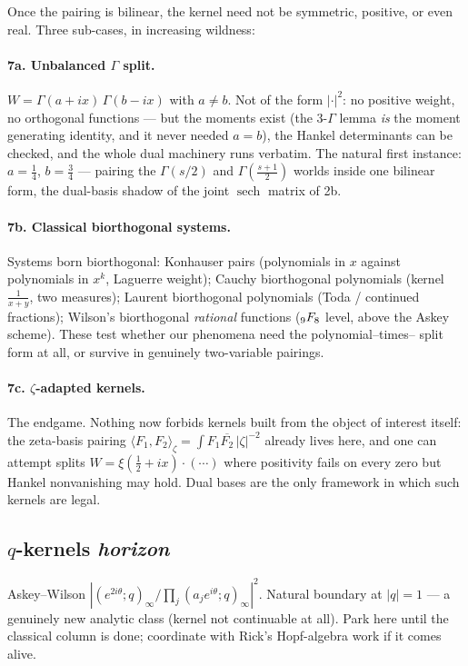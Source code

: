 \documentclass[11pt,a4paper]{article}
\begin{document}
Once the pairing is bilinear, the kernel need not be symmetric,
positive, or even real. Three sub-cases, in increasing wildness:

\paragraph{7a. Unbalanced $\Gamma$ split.}
$W = \Gamma(a+ix)\,\Gamma(b-ix)$ with $a \ne b$. Not of the form
$|\cdot|^2$: no positive weight, no orthogonal functions --- but the
moments exist (the $3$-$\Gamma$ lemma \emph{is} the moment generating
identity, and it never needed $a=b$), the Hankel determinants can be
checked, and the whole dual machinery runs verbatim. The natural first
instance: $a=\tfrac14$, $b=\tfrac34$ --- pairing the $\Gamma(s/2)$ and
$\Gamma(\frac{s+1}{2})$ worlds inside one bilinear form, the dual-basis
shadow of the joint $\operatorname{sech}$ matrix of 2b.

\paragraph{7b. Classical biorthogonal systems.}
Systems born biorthogonal: Konhauser pairs (polynomials in $x$ against
polynomials in $x^k$, Laguerre weight); Cauchy biorthogonal polynomials
(kernel $\frac{1}{x+y}$, two measures); Laurent biorthogonal
polynomials (Toda / continued fractions); Wilson's biorthogonal
\emph{rational} functions ($\mathstrut_{9}F_8$ level, above the Askey
scheme). These test whether our phenomena need the polynomial--times--%
split form at all, or survive in genuinely two-variable pairings.

\paragraph{7c. $\zeta$-adapted kernels.}
The endgame. Nothing now forbids kernels built from the object of
interest itself: the zeta-basis pairing
$\langle F_1,F_2\rangle_\zeta = \int F_1 \overline{F_2}\,|\zeta|^{-2}$
already lives here, and one can attempt splits
$W = \xi(\tfrac12+ix)\cdot(\cdots)$ where positivity fails on every
zero but Hankel nonvanishing may hold. Dual bases are the only
framework in which such kernels are legal.

\subsection{$q$-kernels \hfill \normalfont\emph{horizon}}

Askey--Wilson $|(e^{2i\theta};q)_\infty / \prod_j (a_j e^{i\theta};q)_\infty|^2$.
Natural boundary at $|q|=1$ --- a genuinely new analytic class (kernel
not continuable at all). Park here until the classical column is done;
coordinate with Rick's Hopf-algebra work if it comes alive.
\end{document}
